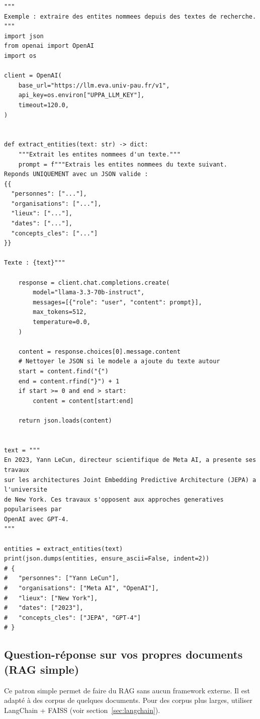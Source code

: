 \documentclass[12pt, a4paper, twoside]{article}
\begin{document}
\begin{lstlisting}[style=pythonstyle, caption={Extraction d'entités nommées avec sortie JSON structurée}]
"""
Exemple : extraire des entites nommees depuis des textes de recherche.
"""
import json
from openai import OpenAI
import os

client = OpenAI(
    base_url="https://llm.eva.univ-pau.fr/v1",
    api_key=os.environ["UPPA_LLM_KEY"],
    timeout=120.0,
)


def extract_entities(text: str) -> dict:
    """Extrait les entites nommees d'un texte."""
    prompt = f"""Extrais les entites nommees du texte suivant.
Reponds UNIQUEMENT avec un JSON valide :
{{
  "personnes": ["..."],
  "organisations": ["..."],
  "lieux": ["..."],
  "dates": ["..."],
  "concepts_cles": ["..."]
}}

Texte : {text}"""

    response = client.chat.completions.create(
        model="llama-3.3-70b-instruct",
        messages=[{"role": "user", "content": prompt}],
        max_tokens=512,
        temperature=0.0,
    )

    content = response.choices[0].message.content
    # Nettoyer le JSON si le modele a ajoute du texte autour
    start = content.find("{")
    end = content.rfind("}") + 1
    if start >= 0 and end > start:
        content = content[start:end]

    return json.loads(content)


text = """
En 2023, Yann LeCun, directeur scientifique de Meta AI, a presente ses travaux
sur les architectures Joint Embedding Predictive Architecture (JEPA) a l'universite
de New York. Ces travaux s'opposent aux approches generatives popularisees par
OpenAI avec GPT-4.
"""

entities = extract_entities(text)
print(json.dumps(entities, ensure_ascii=False, indent=2))
# {
#   "personnes": ["Yann LeCun"],
#   "organisations": ["Meta AI", "OpenAI"],
#   "lieux": ["New York"],
#   "dates": ["2023"],
#   "concepts_cles": ["JEPA", "GPT-4"]
# }
\end{lstlisting}

\subsection{Question-réponse sur vos propres documents (RAG simple)}

Ce patron simple permet de faire du RAG sans aucun framework externe. Il est adapté à
des corpus de quelques documents. Pour des corpus plus larges, utiliser LangChain + FAISS
(voir section~\ref{sec:langchain}).
\end{document}
